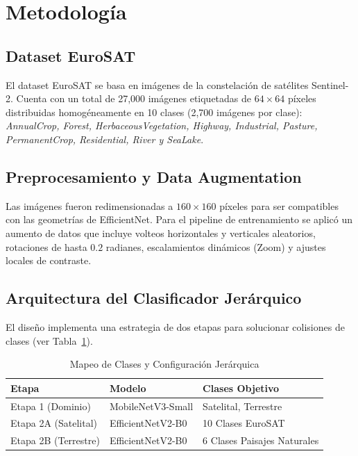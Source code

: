\documentclass[conference,onecolumn]{IEEEtran}
\begin{document}
\section{Metodología}

\subsection{Dataset EuroSAT}
El dataset EuroSAT se basa en imágenes de la constelación de satélites Sentinel-2. Cuenta con un total de 27,000 imágenes etiquetadas de $64 \times 64$ píxeles distribuidas homogéneamente en 10 clases (2,700 imágenes por clase): \textit{AnnualCrop, Forest, HerbaceousVegetation, Highway, Industrial, Pasture, PermanentCrop, Residential, River y SeaLake}.

\subsection{Preprocesamiento y Data Augmentation}
Las imágenes fueron redimensionadas a $160 \times 160$ píxeles para ser compatibles con las geometrías de EfficientNet. Para el pipeline de entrenamiento se aplicó un aumento de datos que incluye volteos horizontales y verticales aleatorios, rotaciones de hasta $0.2$ radianes, escalamientos dinámicos (Zoom) y ajustes locales de contraste.

\subsection{Arquitectura del Clasificador Jerárquico}
El diseño implementa una estrategia de dos etapas para solucionar colisiones de clases (ver Tabla~\ref{tab:mapping}).

\begin{table}[h]
\centering
\caption{Mapeo de Clases y Configuración Jerárquica}
\label{tab:mapping}
\begin{tabular}{lll}
\toprule
\textbf{Etapa} & \textbf{Modelo} & \textbf{Clases Objetivo} \\
\midrule
Etapa 1 (Dominio) & MobileNetV3-Small & Satelital, Terrestre \\
Etapa 2A (Satelital) & EfficientNetV2-B0 & 10 Clases EuroSAT \\
Etapa 2B (Terrestre) & EfficientNetV2-B0 & 6 Clases Paisajes Naturales \\
\bottomrule
\end{tabular}
\end{table}
\end{document}
